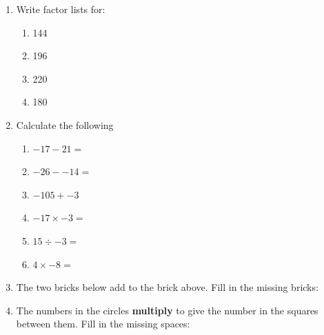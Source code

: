 \documentclass[a4paper,12pt]{article}
\begin{document}
\begin{enumerate}
\begin{multicols}{5}
\begin{enumerate}
			\item 84, 96
		\end{enumerate}
	\end{multicols}
	\item Write factor lists for:
	\begin{multicols}{4}
		\begin{enumerate}
			\item 144
			\item 196
			\item 220
			\item 180
		\end{enumerate} 
	\end{multicols}
	\item Calculate the following
	\begin{multicols}{3}
		\begin{enumerate}
			\item $\displaystyle -17-21= $
			\item $\displaystyle -26--14= $
			\item $\displaystyle -105+-3$
			\item $\displaystyle -17\times -3=$
			\item $\displaystyle 15\div -3=$
			\item $\displaystyle 4\times -8=$
		\end{enumerate}
	\end{multicols}
	\item The two bricks below add to the brick above. Fill in the missing bricks:\\
	\begin{center}
	\end{center}
	\newpage
	\item The numbers in the circles \textbf{multiply} to give the number in the squares between them. Fill in the missing spaces:\\
	\begin{center}
		\begin{tikzpicture}

\end{tikzpicture}
\end{center}
\end{enumerate}
\end{document}
